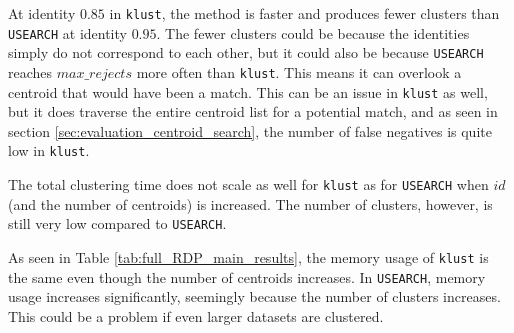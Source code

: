 At identity $0.85$ in \texttt{klust}, the method is faster and produces fewer
clusters than \texttt{USEARCH} at identity $0.95$. The fewer clusters could be
because the identities simply do not correspond to each other, but it could
also be because \texttt{USEARCH} reaches $max\_rejects$ more often than
\texttt{klust}. This means it can overlook a centroid that would have been a
match. This can be an issue in \texttt{klust} as well, but it does traverse
the entire centroid list for a potential match, and as seen in section
\ref{sec:evaluation_centroid_search}, the number of false negatives is quite
low in \texttt{klust}.

The total clustering time does not scale as well for \texttt{klust} as for
\texttt{USEARCH} when $id$ (and the number of centroids) is increased. The
number of clusters, however, is still very low compared to \texttt{USEARCH}.

As seen in Table \ref{tab:full_RDP_main_results}, the memory usage of
\texttt{klust} is the same even though the number of centroids increases. In
\texttt{USEARCH}, memory usage increases significantly, seemingly because the
number of clusters increases. This could be a problem if even larger datasets
are clustered.
